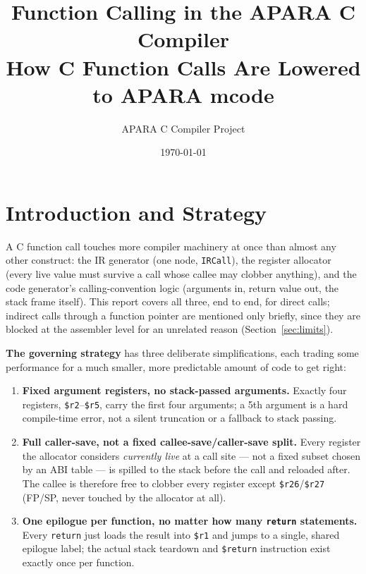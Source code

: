 \documentclass[11pt,a4paper]{article}
\title{\textbf{Function Calling in the APARA C Compiler}\\[2mm]
\large How C Function Calls Are Lowered to APARA mcode}
\author{APARA C Compiler Project}
\date{\today}
\begin{document}
\maketitle
\thispagestyle{fancy}
\vspace{-8mm}

\section{Introduction and Strategy}

A C function call touches more compiler machinery at once than almost any other
construct: the IR generator (one node, \texttt{IRCall}), the register allocator (every
live value must survive a call whose callee may clobber anything), and the code
generator's calling-convention logic (arguments in, return value out, the stack frame
itself). This report covers all three, end to end, for direct calls; indirect calls
through a function pointer are mentioned only briefly, since they are blocked at the
assembler level for an unrelated reason (Section~\ref{sec:limits}).

\textbf{The governing strategy} has three deliberate simplifications, each trading some
performance for a much smaller, more predictable amount of code to get right:
\begin{enumerate}
  \item \textbf{Fixed argument registers, no stack-passed arguments.} Exactly four
        registers, \texttt{\$r2}--\texttt{\$r5}, carry the first four arguments; a 5th
        argument is a hard compile-time error, not a silent truncation or a fallback to
        stack passing.
  \item \textbf{Full caller-save, not a fixed callee-save/caller-save split.} Every
        register the allocator considers \emph{currently live} at a call site --- not a
        fixed subset chosen by an ABI table --- is spilled to the stack before the call
        and reloaded after. The callee is therefore free to clobber every register
        except \texttt{\$r26}/\texttt{\$r27} (FP/SP, never touched by the allocator at
        all).
  \item \textbf{One epilogue per function, no matter how many \texttt{return}
        statements.} Every \texttt{return} just loads the result into \texttt{\$r1} and
        jumps to a single, shared epilogue label; the actual stack teardown and
        \texttt{\$return} instruction exist exactly once per function.
\end{enumerate}
\end{document}
